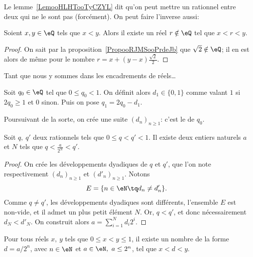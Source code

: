 Le lemme~\ref{LemooHLHTooTyCZYL} dit qu'on peut mettre un rationnel entre deux qui ne le sont pas (forcément). On peut faire l'inverse aussi:
\begin{lemma}\label{IntQestVide_corpsOrdonnes}
  Soient \( x, y \in \eQ \) tels que \( x < y \). Alors il existe un réel \( r \notin \eQ \) tel que \( x < r < y \).
\end{lemma}

\begin{proof}
  On sait par la proposition~\ref{PropooRJMSooPrdeJb} que \( \sqrt 2 \notin \eQ \); il en est alors de même pour le nombre \(r = x + (y-x)\frac {\sqrt 2} 2 \).
\end{proof}


Tant que nous y sommes dans les encadrements de réels\dots
\begin{normaltext}
  Soit \(q_0 \in \eQ \) tel que \( 0 \leq q_0 < 1 \). On définit alors \( d_1 \in \{0, 1\} \) comme valant \( 1 \) si \( 2 q_0 \geq 1 \) et \(0 \) sinon. Puis on pose \( q_1 = 2 q_0 - d_1 \).

  Poursuivant de la sorte, on crée une suite \( (d_n)_{n\geq 1} \): c'est le  de \( q_0 \).
\end{normaltext}

\begin{lemma}        \label{LEMooRSLIooVrZMxM}
  Soit \( q,\ q' \) deux rationnels tels que \( 0 \leq q < q' < 1 \). Il existe deux entiers naturels \( a \) et \( N \) tels que \( q < \frac a {2^N} < q' \).
\end{lemma}
\begin{proof}
  On crée les développements dyadiques de \( q \) et \( q' \), que l'on note respectivement \( (d_n)_{n\geq 1} \) et \( (d'_n)_{n\geq 1} \). Notons
  \begin{equation}
    E = \{ n \in \eN \tq d_n \neq d'_n \}.
  \end{equation}
Comme \( q \neq q' \), les développements dyadiques sont différents, l'ensemble \(E\) est non-vide, et il admet un plus petit élément \(N \). Or, \( q < q' \), et donc nécessairement \( d_N < d'_N \). On construit alors \( a = \sum_{i=1}^{N} d_i 2^i \). 
\end{proof}

\begin{corollary}\label{CorDensiteDyadiques}
  Pour tous réels \(x,\ y\) tels que \( 0 \leq x < y \leq 1 \), il existe un nombre de la forme \( d = a / 2^n \), avec \( n \in \eN \) et \( a \in \eN,\ a \leq 2^n\), tel que \( x < d < y \).
\end{corollary}

